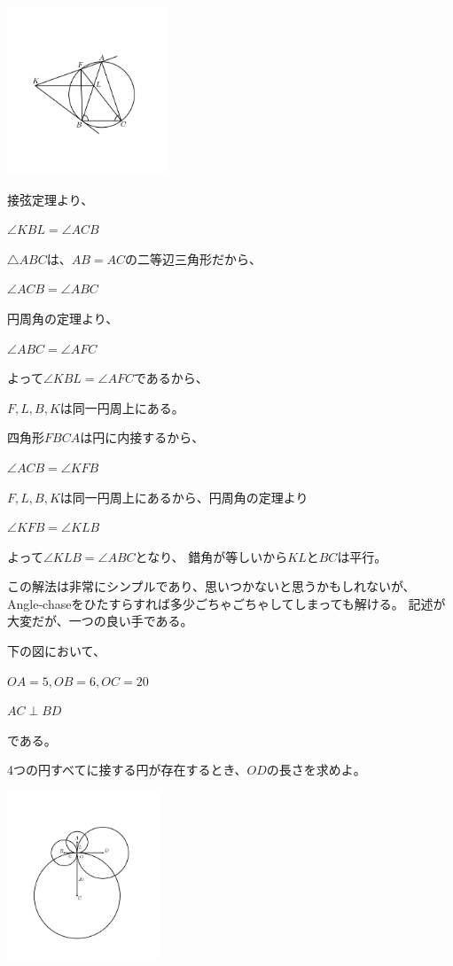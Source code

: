 \documentclass[uplatex,dvipdfmx]{jsbook}
\begin{document}
\begin{answer}
    \includegraphics[clip,height=5cm]{figures/practice3.pdf}

    接弦定理より、

    $\angle KBL=\angle ACB$

    $\triangle ABC$は、$AB=AC$の二等辺三角形だから、

    $\angle ACB=\angle ABC$

    円周角の定理より、

    $\angle ABC=\angle AFC$

    よって$\angle KBL=\angle AFC$であるから、

    $F,L,B,K$は同一円周上にある。

    四角形$FBCA$は円に内接するから、

    $\angle ACB=\angle KFB$

    $F,L,B,K$は同一円周上にあるから、円周角の定理より

    $\angle KFB=\angle KLB$

    よって$\angle KLB=\angle ABC$となり、
    錯角が等しいから$KL$と$BC$は平行。
\end{answer}
この解法は非常にシンプルであり、思いつかないと思うかもしれないが、
Angle-chaseをひたすらすれば多少ごちゃごちゃしてしまっても解ける。
記述が大変だが、一つの良い手である。

\begin{problem}[練習問題4]
    下の図において、

    $OA=5,OB=6,OC=20$

    $AC\perp BD$

    である。

    4つの円すべてに接する円が存在するとき、$OD$の長さを求めよ。

    \includegraphics[clip,height=5cm]{figures/practice4.pdf}
\end{problem}
\end{document}
